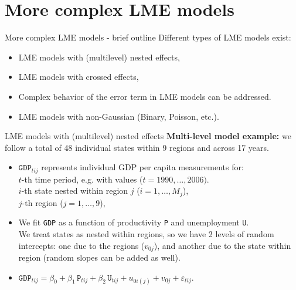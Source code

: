 \documentclass{beamer}
\begin{document}
\section{More complex LME models}
\begin{frame}{More complex LME models - brief outline}
Different types of LME models exist:\\
\bigskip
\begin{itemize}
\item LME models with (multilevel) nested effects,
\medskip
\item LME models with crossed effects,
\medskip
\item Complex behavior of the error term in LME models can be addressed.
\medskip
\item LME models with non-Gaussian (Binary, Poisson, etc.).
\end{itemize}
\end{frame}
\begin{frame}{LME models with (multilevel) nested effects}
\textbf{Multi-level model example:} we follow a total of 48 individual states within 9 regions and across 17 years.
\medskip
\begin{itemize}
\item $\texttt{GDP}_{tij}$ represents individual GDP per capita measurements for:\\
\smallskip
$t$-th time period, e.g. with values ($t= 1990, \dots, 2006)$.\\
$i$-th state nested within region $j$ ($i=1,\dots,M_j$),\\
$j$-th region ($j=1,\dots,9$),\\



\medskip
\item We fit \texttt{GDP} as a function of productivity \texttt{P} and unemployment \texttt{U}.\\
\smallskip
We treat states as nested within regions, so we have 2 levels of random intercepts: one due to the regions ($v_{0j}$), and another due to the state within region (random slopes can be added as well).
\bigskip
\item $\texttt{GDP}_{tij} = \beta_0 + \beta_1 \, \texttt{P}_{tij} 
+ \beta_2 \, \texttt{U}_{tij} + u_{0i(j)} + v_{0j}  + \varepsilon_{tij}.$
\end{itemize}
\end{frame}
\end{document}
